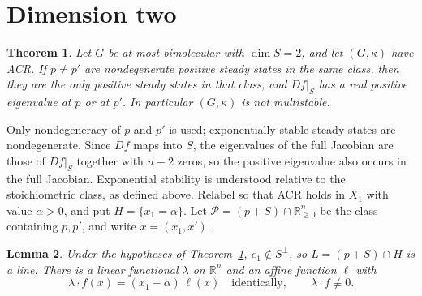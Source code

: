 \documentclass[11pt]{amsart}
\newtheorem{theorem}{Theorem}[section]
\newtheorem{lemma}[theorem]{Lemma}
\theoremstyle{definition}
\theoremstyle{remark}
\newcommand{\R}{\mathbb R}
\begin{document}
\section{Dimension two}

\begin{theorem}\label{thm:dim2}
Let $G$ be at most bimolecular with $\dim S=2$, and let $(G,\kappa)$ have ACR. If $p\ne p'$ are nondegenerate positive steady states in the same class, then they are the only positive steady states in that class, and $Df|_S$ has a real positive eigenvalue at $p$ or at $p'$. In particular $(G,\kappa)$ is not multistable.
\end{theorem}

Only nondegeneracy of $p$ and $p'$ is used; exponentially stable steady states are nondegenerate. Since $Df$ maps into $S$, the eigenvalues of the full Jacobian are those of $Df|_S$ together with $n-2$ zeros, so the positive eigenvalue also occurs in the full Jacobian. Exponential stability is understood relative to the stoichiometric class, as defined above. Relabel so that ACR holds in $X_1$ with value $\alpha>0$, and put $H=\{x_1=\alpha\}$. Let $\mathcal P=(p+S)\cap\R^n_{\ge0}$ be the class containing $p,p'$, and write $x=(x_1,x')$.

\begin{lemma}\label{lem:factor}
Under the hypotheses of Theorem~\ref{thm:dim2}, $e_1\notin S^\perp$, so $L=(p+S)\cap H$ is a line. There is a linear functional $\lambda$ on $\R^n$ and an affine function $\ell$ with
\begin{equation}\label{eq:factor}
 \lambda\cdot f(x)=(x_1-\alpha)\,\ell(x)\quad\text{identically},\qquad \lambda\cdot f\not\equiv0 .
\end{equation}
\end{lemma}
\end{document}
